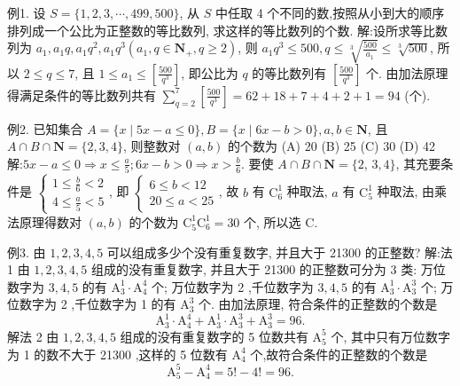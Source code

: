 例1. 设 $S=\{1,2,3, \cdots, 499,500\}$, 从 $S$ 中任取 4 个不同的数,按照从小到大的顺序排列成一个公比为正整数的等比数列, 求这样的等比数列的个数.
解:设所求等比数列为 $a_1, a_1 q, a_1 q^2, a_1 q^3\left(a_1, q \in \mathbf{N}_{+}, q \geqslant 2\right)$, 则 $a_1 q^3 \leqslant 500, q \leqslant \sqrt[3]{\frac{500}{a_1}} \leqslant \sqrt[3]{500}$, 所以 $2 \leqslant q \leqslant 7$, 且 $1 \leqslant a_1 \leqslant\left[\frac{500}{q^3}\right]$, 即公比为 $q$ 的等比数列有 $\left[\frac{500}{q^3}\right]$ 个.
由加法原理得满足条件的等比数列共有 $\sum_{q=2}^7\left[\frac{500}{q^3}\right]=62+18+7+4+ 2+1=94$ (个).



例2. 已知集合 $A=\{x \mid 5 x-a \leqslant 0\}, B=\{x \mid 6 x-b>0\}, a, b \in \mathbf{N}$, 且 $A \cap B \cap \mathbf{N}=\{2,3,4\}$, 则整数对 $(a, b)$ 的个数为
(A) 20
(B) 25
(C) 30
(D) 42
解:$5 x-a \leqslant 0 \Rightarrow x \leqslant \frac{a}{5} ; 6 x-b>0 \Rightarrow x>\frac{b}{6}$. 要使 $A \cap B \cap \mathbf{N}=\{2$,
$3,4\}$, 其充要条件是 $\left\{\begin{array}{l}1 \leqslant \frac{b}{6}<2 \\ 4 \leqslant \frac{a}{5}<5\end{array}\right.$, 即 $\left\{\begin{array}{l}6 \leqslant b<12 \\ 20 \leqslant a<25\end{array}\right.$, 故 $b$ 有 $\mathrm{C}_6^1$ 种取法, $a$ 有 $\mathrm{C}_5^1$ 种取法, 由乘法原理得数对 $(a, b)$ 的个数为 $\mathrm{C}_5^1 \mathrm{C}_6^1=30$ 个, 所以选 $\mathrm{C}$.



例3. 由 $1,2,3,4,5$ 可以组成多少个没有重复数字, 并且大于 21300 的正整数?
解:法 1 由 $1,2,3,4,5$ 组成的没有重复数字, 并且大于 21300 的正整数可分为 3 类:
万位数字为 $3,4,5$ 的有 $\mathrm{A}_3^1 \cdot \mathrm{A}_4^4$ 个;
万位数字为 2 ,千位数字为 $3,4,5$ 的有 $\mathrm{A}_3^1 \cdot \mathrm{A}_3^3$ 个;
万位数字为 2 ,千位数字为 1 的有 $\mathrm{A}_3^3$ 个.
由加法原理, 符合条件的正整数的个数是
$$
\mathrm{A}_3^1 \cdot \mathrm{A}_4^4+\mathrm{A}_3^1 \cdot \mathrm{A}_3^3+\mathrm{A}_3^3=96 .
$$
解法 2 由 $1,2,3,4,5$ 组成的没有重复数字的 5 位数共有 $\mathrm{A}_5^5$ 个, 其中只有万位数字为 1 的数不大于 21300 ,这样的 5 位数有 $\mathrm{A}_4^4$ 个,故符合条件的正整数的个数是
$$
\mathrm{A}_5^5-\mathrm{A}_4^4=5 !-4 !=96 .
$$



